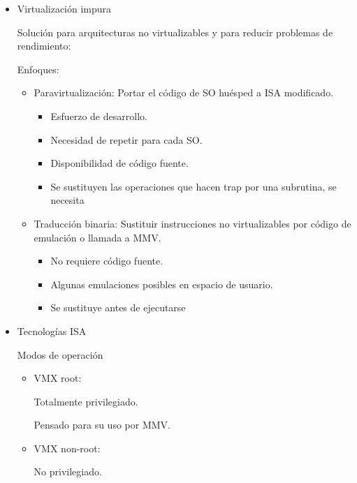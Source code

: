 \documentclass[12pt, twoside, openright]{report} %
\begin{document}
  \begin{itemize}
  \item
    Virtualización impura

    Solución para arquitecturas no virtualizables y para
reducir problemas de rendimiento:

Enfoques:
\begin{itemize}
  \item Paravirtualización: Portar el código de SO huésped a ISA
modificado.
\begin{itemize}
  \item Esfuerzo de desarrollo.
  \item Necesidad de repetir para cada SO.
  \item Disponibilidad de código fuente.
  \item Se sustituyen las operaciones que hacen trap por una subrutina, se necesita
\end{itemize}

  \item Traducción binaria: Sustituir instrucciones no
virtualizables por código de emulación o llamada a MMV.
\begin{itemize}
  \item No requiere código fuente.
  \item Algunas emulaciones posibles en espacio de usuario.
  \item Se sustituye antes de ejecutarse
\end{itemize}

\end{itemize}

  \item
    Tecnologías ISA
    \begin{figure}[H]
      {\def\svgwidth{.9\textwidth}
  }
    \end{figure}
    \begin{figure}[H]
      {\def\svgwidth{.9\textwidth}
  }
    \end{figure}
    Modos de operación
\begin{itemize}
  \item VMX root:

Totalmente privilegiado.

Pensado para su uso por MMV.
  \item VMX non-root:

No privilegiado.


\end{itemize}
\end{itemize}
\end{document}
